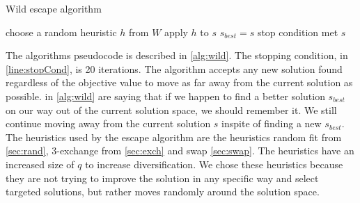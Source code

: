 \documentclass[../main.tex]{subfiles}
\begin{document}
\begin{algorithm}
    \label{alg:wild}
    \caption{Wild escape algorithm}
    \begin{algorithmic}[1]
        \Repeat
            \State choose a random heuristic $h$ from $W$
            \State apply $h$ to $s$
             \label{line:best}
                \State $s_{best} = s$ \label{line:best2}
            \EndIf
        \Until stop condition met \label{line:stopCond}
        \State \Return $s$
        \EndFunction
    \end{algorithmic}
\end{algorithm}

The algorithms pseudocode is described in \cref{alg:wild}. 
The stopping condition, in \cref{line:stopCond}, is 20 iterations. 
The algorithm accepts any new solution found regardless of the objective value to move as far away from the current solution as possible.
 in \cref{alg:wild} are saying that if we happen to find a better solution $s_{best}$ on our way out of the current solution space, we should remember it. We still continue moving away from the current solution $s$ inspite of finding a new $s_{best}$.
The heuristics used by the escape algorithm are the heuristics random fit from \cref{sec:rand}, 3-exchange from \cref{sec:exch} and swap \cref{sec:swap}. 
The heuristics have an increased size of $q$ to increase diversification. 
We chose these heuristics because they are not trying to improve the solution in any specific way and select targeted solutions, but rather moves randomly around the solution space. 
\biblio                                                         
\end{document}
